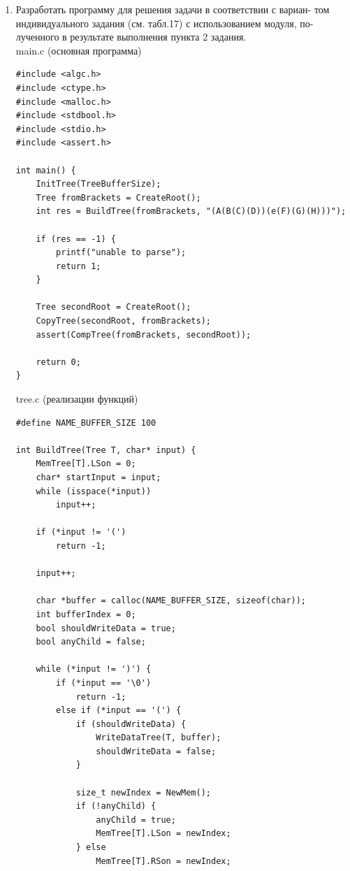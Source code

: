 \documentclass[a4paper,14pt]{extarticle}
\begin{document}
\begin{enumerate}
\begin{verbatim}
int IsEmptyTree(Tree T) {
    TreeError = TreeOk;
    return MemTree[T].RSon == 0 && MemTree[T].LSon == 0;
}

void DelTree(Tree T) {
    TreeError = TreeOk;
    // Please do not the important
    if (T == 0)
        return;

    DelTree(MemTree[T].RSon);
    DelTree(MemTree[T].LSon);

    DisposeMem(T);
}
\end{verbatim}
\item Разработать программу для решения задачи в соответствии с вариан-
том индивидуального задания (см. табл.17) с использованием модуля, по-
лученного в результате выполнения пункта 2 задания.\\
main.c (основная программа)
\begin{verbatim}
#include <algc.h>
#include <ctype.h>
#include <malloc.h>
#include <stdbool.h>
#include <stdio.h>
#include <assert.h>

int main() {
    InitTree(TreeBufferSize);
    Tree fromBrackets = CreateRoot();
    int res = BuildTree(fromBrackets, "(A(B(C)(D))(e(F)(G)(H)))");

    if (res == -1) {
        printf("unable to parse");
        return 1;
    }

    Tree secondRoot = CreateRoot();
    CopyTree(secondRoot, fromBrackets);
    assert(CompTree(fromBrackets, secondRoot));

    return 0;
}
\end{verbatim}
tree.c (реализации функций)
\begin{verbatim}
#define NAME_BUFFER_SIZE 100

int BuildTree(Tree T, char* input) {
    MemTree[T].LSon = 0;
    char* startInput = input;
    while (isspace(*input))
        input++;
    
    if (*input != '(')
        return -1;
    
    input++;

    char *buffer = calloc(NAME_BUFFER_SIZE, sizeof(char));
    int bufferIndex = 0;
    bool shouldWriteData = true;
    bool anyChild = false;

    while (*input != ')') {
        if (*input == '\0')
            return -1;
        else if (*input == '(') {
            if (shouldWriteData) {
                WriteDataTree(T, buffer);
                shouldWriteData = false;
            }

            size_t newIndex = NewMem();
            if (!anyChild) { 
                anyChild = true;
                MemTree[T].LSon = newIndex;
            } else 
                MemTree[T].RSon = newIndex;


\end{verbatim}
\end{enumerate}
\end{document}
